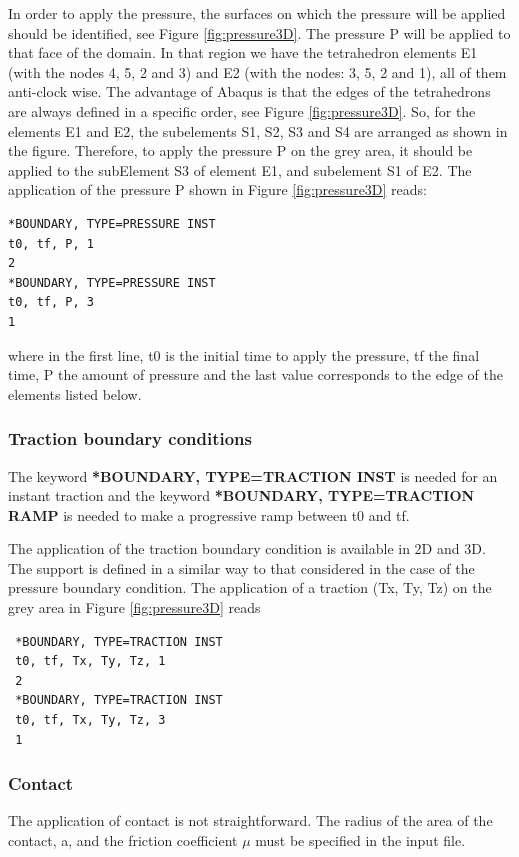 \documentclass[oneside,11pt,times]{book}
\begin{document}
 In order to apply the pressure, the surfaces on which the pressure will be applied should be identified, see Figure \ref{fig:pressure3D}. The pressure P will be applied to that face of the domain. In that region we have the tetrahedron elements E1 (with the nodes 4, 5, 2 and 3) and E2 (with the nodes: 3, 5, 2 and 1), all of them anti-clock wise. The advantage of Abaqus is that the edges of the tetrahedrons are always defined in a specific order, see Figure \ref{fig:pressure3D}. So, for the elements E1 and E2, the subelements S1, S2, S3 and S4 are arranged as shown in the figure. Therefore, to apply the pressure P on the grey area, it should be applied to the subElement S3 of element E1, and subelement S1 of E2. The application of the pressure P shown in Figure \ref{fig:pressure3D} reads:
\begin{lstlisting}
*BOUNDARY, TYPE=PRESSURE INST
t0, tf, P, 1
2
*BOUNDARY, TYPE=PRESSURE INST
t0, tf, P, 3
1
\end{lstlisting}

 where in the first line, t0 is the initial time to apply the pressure, tf the final time, P the amount of pressure and the last value corresponds to the edge of the elements listed below.

 \subsubsection{Traction boundary conditions}

 The keyword \textbf{*BOUNDARY, TYPE=TRACTION INST} is needed for an instant traction and the keyword \textbf{*BOUNDARY, TYPE=TRACTION RAMP} is needed to make a progressive ramp between t0 and tf.

 The application of the traction boundary condition is available in 2D and 3D. The support is defined in a similar way to that considered in the case of the pressure boundary condition. The application of a traction (Tx, Ty, Tz) on the grey area in Figure \ref{fig:pressure3D} reads
 \begin{lstlisting}
 *BOUNDARY, TYPE=TRACTION INST
 t0, tf, Tx, Ty, Tz, 1
 2
 *BOUNDARY, TYPE=TRACTION INST
 t0, tf, Tx, Ty, Tz, 3
 1
 \end{lstlisting}

 \subsubsection{Contact}

 The application of contact is not straightforward. The radius of the area of the contact, a, and the friction coefficient $\mu$ must be specified in the input file.
\end{document}
